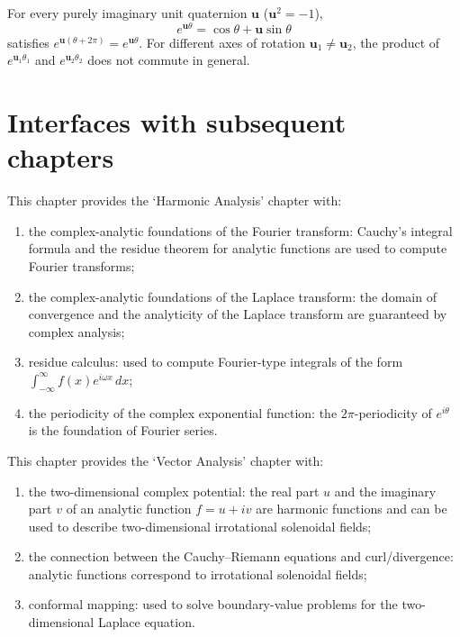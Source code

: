 \begin{example}\label{ex:ca_quaternion_exp}
For every purely imaginary unit quaternion $\mathbf{u}$ ($\mathbf{u}^2 = -1$),
\[
e^{\mathbf{u}\theta} = \cos\theta + \mathbf{u} \sin\theta
\]
satisfies $e^{\mathbf{u}(\theta + 2\pi)} = e^{\mathbf{u}\theta}$. For different axes of rotation $\mathbf{u}_1 \neq \mathbf{u}_2$, the product of $e^{\mathbf{u}_1\theta_1}$ and $e^{\mathbf{u}_2\theta_2}$ does not commute in general.
\end{example}

\section{Interfaces with subsequent chapters}

\begin{remark}\label{rem:ca_to_harmonic}
This chapter provides the `Harmonic Analysis' chapter with:
\begin{enumerate}[label=(\roman*)]
    \item the complex-analytic foundations of the Fourier transform: Cauchy's integral formula and the residue theorem for analytic functions are used to compute Fourier transforms;
    \item the complex-analytic foundations of the Laplace transform: the domain of convergence and the analyticity of the Laplace transform are guaranteed by complex analysis;
    \item residue calculus: used to compute Fourier-type integrals of the form $\int_{-\infty}^{\infty} f(x) e^{i\omega x} \, dx$;
    \item the periodicity of the complex exponential function: the $2\pi$-periodicity of $e^{i\theta}$ is the foundation of Fourier series.
\end{enumerate}
\end{remark}

\begin{remark}\label{rem:ca_to_vector_analysis}
This chapter provides the `Vector Analysis' chapter with:
\begin{enumerate}[label=(\roman*)]
    \item the two-dimensional complex potential: the real part $u$ and the imaginary part $v$ of an analytic function $f = u + iv$ are harmonic functions and can be used to describe two-dimensional irrotational solenoidal fields;
    \item the connection between the Cauchy--Riemann equations and curl/divergence: analytic functions correspond to irrotational solenoidal fields;
    \item conformal mapping: used to solve boundary-value problems for the two-dimensional Laplace equation.
\end{enumerate}
\end{remark}

